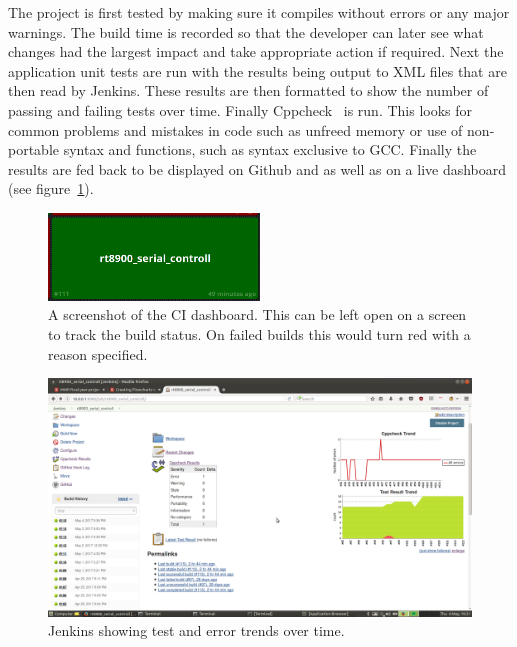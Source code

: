 The project is first tested by making sure it compiles without errors or any major warnings. The build time is recorded so that the developer can later see what changes had the largest impact and take appropriate action if required. Next the application unit tests are run with the results being output to XML files that are then read by Jenkins. These results are then formatted to show the number of passing and failing tests over time. Finally Cppcheck~\cite{Cppcheck} is run. This looks for common problems and mistakes in code such as unfreed memory or use of non-portable syntax and functions, such as syntax exclusive to GCC. Finally the results are fed back to be displayed on Github and as well as on a live dashboard (see figure~\ref{fig:ci_dashboard}). 

\begin{figure}
    \centering
    \includegraphics[width=0.5\textwidth]{img/CI_dashboard.png}
    \caption{A screenshot of the CI dashboard. This can be left open on a screen to track the build status. On failed builds this would turn red with a reason specified.}
    \label{fig:ci_dashboard}
\end{figure}

\begin{figure}
    \centering
    \includegraphics[width=1\textwidth]{img/jenkins_build.png}
    \caption[Jenkins build trends]{Jenkins showing test and error trends over time.}
    \label{fig:jenkins_build}
\end{figure}

